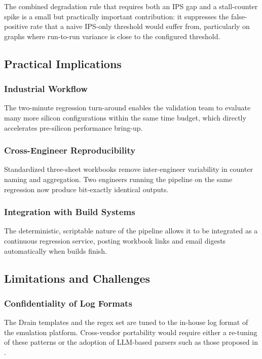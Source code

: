 \documentclass[conference]{IEEEtran}
\begin{document}
The combined degradation rule that requires both an IPS gap and a stall-counter spike is a small but practically important contribution: it suppresses the false-positive rate that a naive IPS-only threshold would suffer from, particularly on graphs where run-to-run variance is close to the configured threshold.

\subsection{Practical Implications}
\subsubsection{Industrial Workflow}
The two-minute regression turn-around enables the validation team to evaluate many more silicon configurations within the same time budget, which directly accelerates pre-silicon performance bring-up.

\subsubsection{Cross-Engineer Reproducibility}
Standardized three-sheet workbooks remove inter-engineer variability in counter naming and aggregation. Two engineers running the pipeline on the same regression now produce bit-exactly identical outputs.

\subsubsection{Integration with Build Systems}
The deterministic, scriptable nature of the pipeline allows it to be integrated as a continuous regression service, posting workbook links and email digests automatically when builds finish.

\subsection{Limitations and Challenges}
\subsubsection{Confidentiality of Log Formats}
The Drain templates and the regex set are tuned to the in-house log format of the emulation platform. Cross-vendor portability would require either a re-tuning of these patterns or the adoption of LLM-based parsers such as those proposed in \cite{le2023logprompt, zhang2025semanticlog}.
\end{document}
